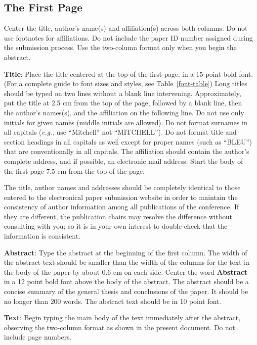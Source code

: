 \documentclass[11pt,a4paper]{article}
\begin{document}
\subsection{The First Page}
\label{ssec:first}

Center the title, author's name(s) and affiliation(s) across both
columns. Do not use footnotes for affiliations. Do not include the
paper ID number assigned during the submission process. Use the
two-column format only when you begin the abstract.

{\bf Title}: Place the title centered at the top of the first page, in
a 15-point bold font. (For a complete guide to font sizes and styles,
see Table~\ref{font-table}) Long titles should be typed on two lines
without a blank line intervening. Approximately, put the title at 2.5
cm from the top of the page, followed by a blank line, then the
author's names(s), and the affiliation on the following line. Do not
use only initials for given names (middle initials are allowed). Do
not format surnames in all capitals ({\em e.g.}, use ``Mitchell'' not
``MITCHELL'').  Do not format title and section headings in all
capitals as well except for proper names (such as ``BLEU'') that are
conventionally in all capitals.  The affiliation should contain the
author's complete address, and if possible, an electronic mail
address. Start the body of the first page 7.5 cm from the top of the
page.

The title, author names and addresses should be completely identical
to those entered to the electronical paper submission website in order
to maintain the consistency of author information among all
publications of the conference. If they are different, the publication
chairs may resolve the difference without consulting with you; so it
is in your own interest to double-check that the information is
consistent.

{\bf Abstract}: Type the abstract at the beginning of the first
column. The width of the abstract text should be smaller than the
width of the columns for the text in the body of the paper by about
0.6 cm on each side. Center the word {\bf Abstract} in a 12 point bold
font above the body of the abstract. The abstract should be a concise
summary of the general thesis and conclusions of the paper. It should
be no longer than 200 words. The abstract text should be in 10 point font.

{\bf Text}: Begin typing the main body of the text immediately after
the abstract, observing the two-column format as shown in 
the present document. Do not include page numbers.
\end{document}
